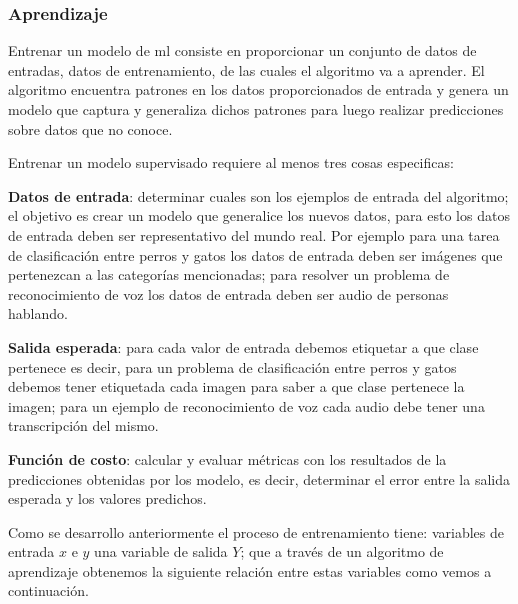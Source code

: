 

\subsubsection{Aprendizaje}\label{sub:aprendizaje}
Entrenar un modelo de \ac{ml} consiste en proporcionar un conjunto de datos de entradas, datos de entrenamiento, de las cuales el algoritmo va a aprender. El algoritmo encuentra patrones en los datos proporcionados de entrada y genera un modelo que captura y generaliza dichos patrones para luego realizar predicciones sobre datos que no conoce.

Entrenar un modelo supervisado requiere al menos tres cosas especificas:
\par \textbf{Datos de entrada}: determinar cuales son los ejemplos de entrada del algoritmo; el objetivo es crear un modelo que generalice los nuevos datos, para esto los datos de entrada deben ser representativo del mundo real. Por ejemplo para una tarea de clasificación entre perros y gatos los datos de entrada deben ser imágenes que pertenezcan a las categorías mencionadas; para resolver un problema de reconocimiento de voz los datos de entrada deben ser audio de personas hablando.

\par \textbf{Salida esperada}: para cada valor de entrada debemos etiquetar a que clase pertenece es decir, para un problema de clasificación entre perros y gatos debemos tener etiquetada cada imagen para saber a que clase pertenece la imagen; para un ejemplo de reconocimiento de voz cada audio debe tener una transcripción del mismo.

\par \textbf{Función de costo}: calcular y evaluar métricas con los resultados de la predicciones obtenidas por los modelo, es decir, determinar el error entre la salida esperada y los valores predichos.

Como se desarrollo anteriormente el proceso de entrenamiento tiene: variables de entrada $ x$ e  $ y$  una variable de salida $ Y$; que a través de un algoritmo de aprendizaje obtenemos la siguiente relación entre estas variables como vemos a continuación.


